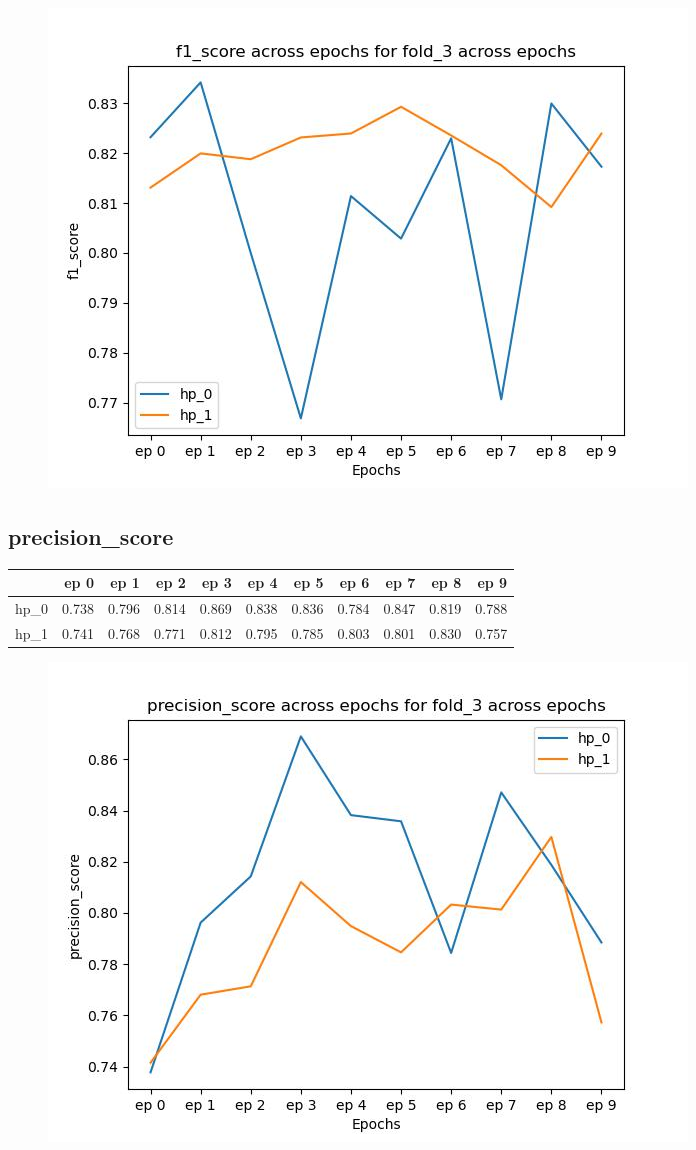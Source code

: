 \documentclass{article}
\begin{document}
\begin{figure}[H]
\includegraphics[scale = 0.75]{fold_3/f1_score}
\end{figure}
\subsection{precision\_score}
\begin{tabular}{lrrrrrrrrrr}
\toprule
{} &   ep 0 &   ep 1 &   ep 2 &   ep 3 &   ep 4 &   ep 5 &   ep 6 &   ep 7 &   ep 8 &   ep 9 \\
\midrule
hp\_0 &  0.738 &  0.796 &  0.814 &  0.869 &  0.838 &  0.836 &  0.784 &  0.847 &  0.819 &  0.788 \\
hp\_1 &  0.741 &  0.768 &  0.771 &  0.812 &  0.795 &  0.785 &  0.803 &  0.801 &  0.830 &  0.757 \\
\bottomrule
\end{tabular}

\begin{figure}[H]
\includegraphics[scale = 0.75]{fold_3/precision_score}
\end{figure}
\end{document}
